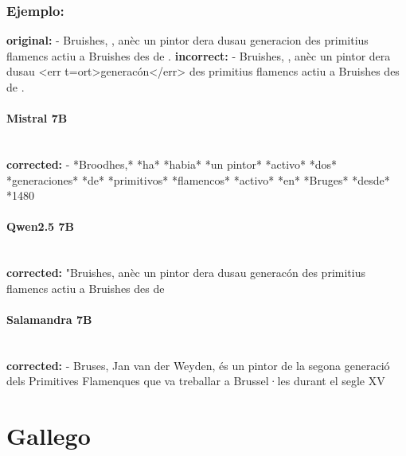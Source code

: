\subsubsection{Ejemplo:}
\textbf{original:} - Bruishes, , anèc un pintor dera dusau generacion des primitius flamencs actiu a Bruishes des de .
\textbf{incorrect:} - Bruishes, , anèc un pintor dera dusau {\textless}err t=ort{\textgreater}generacón{\textless}/err{\textgreater} des primitius flamencs actiu a Bruishes des de .

\paragraph{Mistral 7B}~\\
\textbf{corrected:} - *Broodhes,* *ha* *habia* *un pintor* *activo* *dos* *generaciones* *de* *primitivos* *flamencos* *activo* *en* *Bruges* *desde* *1480

\paragraph{Qwen2.5 7B}~\\
\textbf{corrected:} "Bruishes, anèc un pintor dera dusau generacón des primitius flamencs actiu a Bruishes des de

\paragraph{Salamandra 7B}~\\
\textbf{corrected:} - Bruses, Jan van der Weyden, és un pintor de la segona generació dels Primitives Flamenques que va treballar a Brussel·les durant el segle XV

\vspace{1em}

\section{Gallego}

